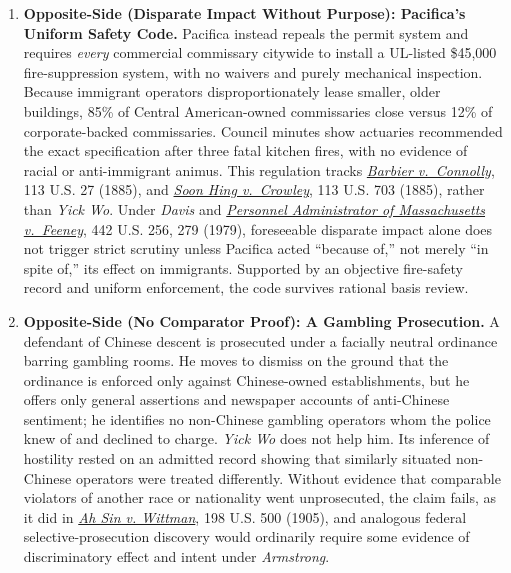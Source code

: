 \documentclass[12pt]{article}
\begin{document}
\begin{enumerate}
\item \textbf{Opposite-Side (Disparate Impact Without Purpose): Pacifica's Uniform Safety Code.} Pacifica instead repeals the permit system and requires \emph{every} commercial commissary citywide to install a UL-listed \$45,000 fire-suppression system, with no waivers and purely mechanical inspection. Because immigrant operators disproportionately lease smaller, older buildings, 85\% of Central American-owned commissaries close versus 12\% of corporate-backed commissaries. Council minutes show actuaries recommended the exact specification after three fatal kitchen fires, with no evidence of racial or anti-immigrant animus. This regulation tracks \href{https://supreme.justia.com/cases/federal/us/113/27/}{\emph{Barbier v.\ Connolly}}, 113 U.S. 27 (1885), and \href{https://supreme.justia.com/cases/federal/us/113/703/}{\emph{Soon Hing v.\ Crowley}}, 113 U.S. 703 (1885), rather than \emph{Yick Wo}. Under \emph{Davis} and \href{https://supreme.justia.com/cases/federal/us/442/256/}{\emph{Personnel Administrator of Massachusetts v.\ Feeney}}, 442 U.S. 256, 279 (1979), foreseeable disparate impact alone does not trigger strict scrutiny unless Pacifica acted ``because of,'' not merely ``in spite of,'' its effect on immigrants. Supported by an objective fire-safety record and uniform enforcement, the code survives rational basis review.

\item \textbf{Opposite-Side (No Comparator Proof): A Gambling Prosecution.} A defendant of Chinese descent is prosecuted under a facially neutral ordinance barring gambling rooms. He moves to dismiss on the ground that the ordinance is enforced only against Chinese-owned establishments, but he offers only general assertions and newspaper accounts of anti-Chinese sentiment; he identifies no non-Chinese gambling operators whom the police knew of and declined to charge. \textit{Yick Wo} does not help him. Its inference of hostility rested on an admitted record showing that similarly situated non-Chinese operators were treated differently. Without evidence that comparable violators of another race or nationality went unprosecuted, the claim fails, as it did in \href{https://supreme.justia.com/cases/federal/us/198/500/}{\emph{Ah Sin v. Wittman}}, 198 U.S. 500 (1905), and analogous federal selective-prosecution discovery would ordinarily require some evidence of discriminatory effect and intent under \textit{Armstrong}.


\end{enumerate}
\end{document}
